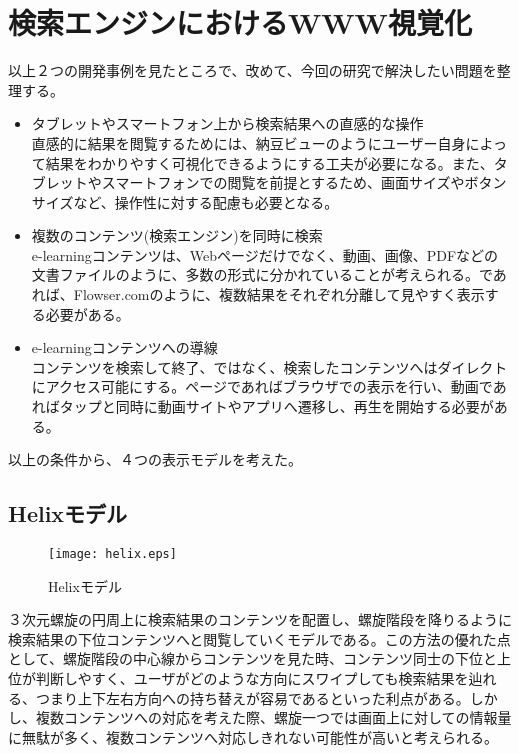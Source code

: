 \section{検索エンジンにおけるWWW視覚化}
以上２つの開発事例を見たところで、改めて、今回の研究で解決したい問題を整理する。
\begin{itemize}
\item タブレットやスマートフォン上から検索結果への直感的な操作
\\
直感的に結果を閲覧するためには、納豆ビューのようにユーザー自身によって結果をわかりやすく可視化できるようにする工夫が必要になる。また、タブレットやスマートフォンでの閲覧を前提とするため、画面サイズやボタンサイズなど、操作性に対する配慮も必要となる。
\\
\item 複数のコンテンツ(検索エンジン)を同時に検索
\\
e-learningコンテンツは、Webページだけでなく、動画、画像、PDFなどの文書ファイルのように、多数の形式に分かれていることが考えられる。であれば、Flowser.comのように、複数結果をそれぞれ分離して見やすく表示する必要がある。
\\
\item e-learningコンテンツへの導線
\\
コンテンツを検索して終了、ではなく、検索したコンテンツへはダイレクトにアクセス可能にする。ページであればブラウザでの表示を行い、動画であればタップと同時に動画サイトやアプリへ遷移し、再生を開始する必要がある。
\end{itemize}

以上の条件から、４つの表示モデルを考えた。

\subsection{Helixモデル}
\begin{figure}[htbp]
\begin{center}
\texttt{[image: helix.eps]}
\caption{Helixモデル}
\label{helix}
\end{center}
\end{figure}
３次元螺旋の円周上に検索結果のコンテンツを配置し、螺旋階段を降りるように検索結果の下位コンテンツへと閲覧していくモデルである。この方法の優れた点として、螺旋階段の中心線からコンテンツを見た時、コンテンツ同士の下位と上位が判断しやすく、ユーザがどのような方向にスワイプしても検索結果を辿れる、つまり上下左右方向への持ち替えが容易であるといった利点がある。しかし、複数コンテンツへの対応を考えた際、螺旋一つでは画面上に対しての情報量に無駄が多く、複数コンテンツへ対応しきれない可能性が高いと考えられる。

